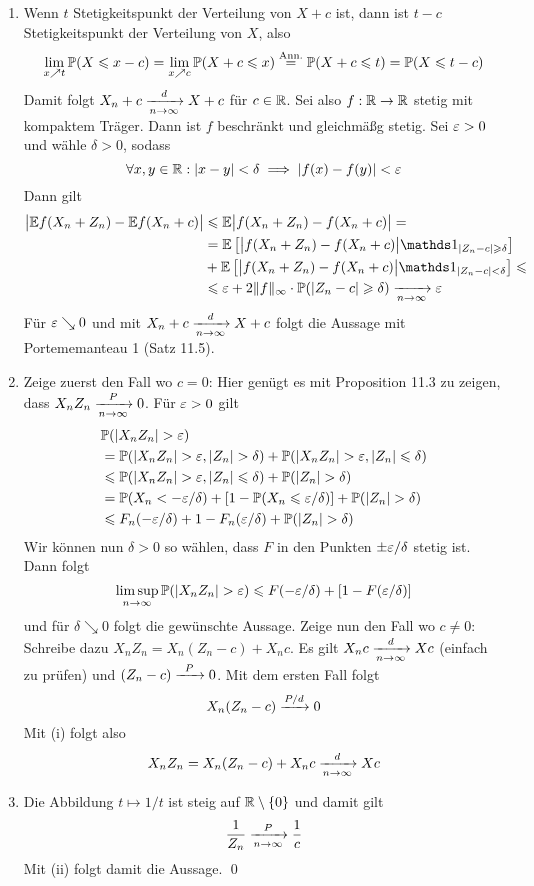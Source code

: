 \documentclass[11pt]{report}
\begin{document}
\begin{enumerate}[label=(\roman*)]
    \item Wenn $t$ Stetigkeitspunkt der Verteilung von $X+c$ ist, dann ist $t-c$ Stetigkeitspunkt der Verteilung von $X$, also 
    $$\lim_{x\nearrow t}\mathbb{P}(X\leqslant x-c)=\lim_{x\nearrow c}\mathbb{P}(X+c\leqslant x)\overset{\text{Ann.}}{=}\mathbb{P}(X+c\leqslant t)=\mathbb{P}(X\leqslant t-c)$$
    Damit folgt $X_n+c\nto{d}{n\to\infty}X+c$ f\"ur $c\in\mathbb{R}$. \newline
    Sei also $f:\mathbb{R}\to\mathbb{R}$ stetig mit kompaktem Tr\"ager. Dann ist $f$ beschr\"ankt und gleichm\"a\ss{}g stetig. Sei $\varepsilon>0$ und w\"ahle $\delta>0$, sodass
    $$\forall x,y\in\mathbb{R}:|x-y|<\delta\implies|f(x)-f(y)|<\varepsilon$$
    Dann gilt
    \begin{align*}
        \big|\E f(X_n+Z_n)-\E f(X_n+c)\big|&\leq\E\big|f(X_n+Z_n)-f(X_n+c)\big|=\\
        &=\E\left[\big|f(X_n+Z_n)-f(X_n+c)\big|\ind{|Z_n-c|\geq\delta}\right]\\&+\E\left[\big|f(X_n+Z_n)-f(X_n+c)\big|\ind{|Z_n-c|<\delta}\right]\leq\\
        &\leq\eps+2\Vert f\Vert_\infty\cdot\Pp(|Z_n-c|\geq\delta)\nto{}{n\to\infty}\eps
    \end{align*}
    F\"ur $\varepsilon\searrow 0$ und mit $X_n+c\nto{d}{n\to\infty}X+c$ folgt die Aussage mit Portememanteau 1 (Satz 11.5).
    \item Zeige zuerst den Fall wo $c=0$: \newline 
    Hier gen\"ugt es mit Proposition 11.3 zu zeigen, dass $X_nZ_n\nto{P}{n\to\infty}0$. F\"ur $\varepsilon>0$ gilt
    \begin{align*}
        &\Pp(|X_nZ_n|>\eps)\\
        &=\Pp(|X_nZ_n|>\eps,|Z_n|>\delta)+\Pp(|X_nZ_n|>\eps,|Z_n|\leq\delta)\\
        &\leq\Pp(|X_nZ_n|>\eps,|Z_n|\leq\delta)+\Pp(|Z_n|>\delta)\\
        &=\Pp(X_n<-\eps/\delta)+[1-\Pp(X_n\leq\eps/\delta)]+\Pp(|Z_n|>\delta) \\
        &\leq F_n(-\eps/\delta)+1-F_n(\eps/\delta)+\Pp(|Z_n|>\delta)
    \end{align*}
    Wir k\"onnen nun $\delta>0$ so w\"ahlen, dass $F$ in den Punkten $\pm\varepsilon/\delta$ stetig ist. Dann folgt
    $$\limsup_{n\to\infty}\Pp(|X_nZ_n|>\eps)\leq F(-\eps/\delta)+[1-F(\eps/\delta)]$$
    und f\"ur $\delta\searrow0$ folgt die gew\"unschte Aussage.\newline
    Zeige nun den Fall wo $c\neq0$: \newline
    Schreibe dazu $X_nZ_n=X_n(Z_n-c)+X_nc$. Es gilt $X_nc\nto{d}{n\to\infty}Xc$ (einfach zu pr\"ufen) und $(Z_n-c)\nto{P}{}0$. Mit dem ersten Fall folgt
    $$X_n(Z_n-c)\nto{P/d}{}0$$
    Mit (i) folgt also 
    $$X_nZ_n=X_n(Z_n-c)+X_nc\nto{d}{n\to\infty}Xc$$
    \item Die Abbildung $t\mapsto 1/t$ ist steig auf $\mathbb{R}\setminus \{0\}$ und damit gilt 
    $$\frac{1}{Z_n}\nto{P}{n\to\infty}\frac{1}{c}$$
    Mit (ii) folgt damit die Aussage. \qed
\end{enumerate}
\end{document}
